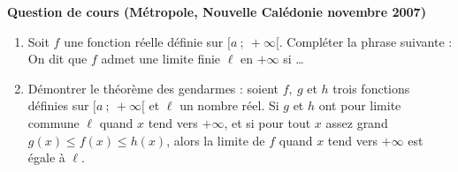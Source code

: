 \documentclass[a4paper,11pt,DIV12,BCOR0mm]{scrartcl}
\begin{document}
\begin{exercice}
 \textbf{Question de cours (Métropole, Nouvelle Calédonie novembre 2007) }
\begin{enumerate}
\item Soit $f$ une fonction r\'eelle d\'efinie sur $[a~;~+ \infty[$. Compl\'eter la phrase suivante :\\
\og On dit que $f$ admet une limite finie $\ell$ en $+ \infty$ si \ldots \fg
\item D\'emontrer le th\'eor\`eme \og des gendarmes \fg{}: soient $f,~g$ et $h$ trois fonctions d\'efinies sur $[a~;~+ \infty[$ et $\ell$ un nombre r\'eel. Si $g$ et $h$ ont pour limite commune $\ell$ quand $x$ tend vers $+ \infty$, et si pour tout $x$ assez grand $g(x) \leqslant f(x) \leqslant h(x)$, alors la limite de $f$ quand $x$ tend vers $+ \infty$ est \'egale \`a $\ell$.
\end{enumerate}
\end{exercice}
\end{document}
